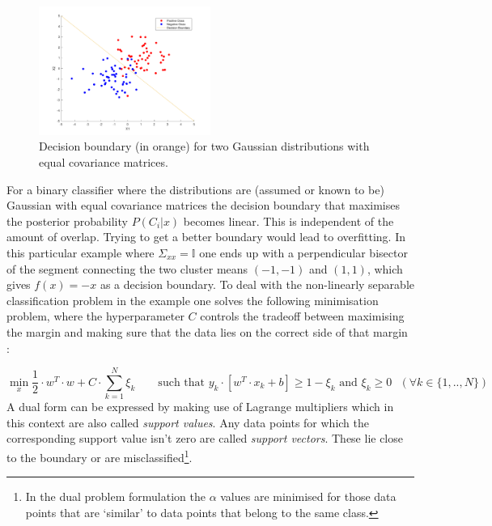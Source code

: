 
\begingroup
\setlength{\columnsep}{0.5cm}
\setlength{\intextsep}{0.5cm}
\begin{figure}
\includegraphics[width=0.5\textwidth]{../src/figures/twogaussians.pdf}
\caption{Decision boundary (in orange) for two Gaussian distributions with equal covariance matrices.}
\label{twogaussians}
\end{figure}
For a binary classifier where the distributions are (assumed or known to be) Gaussian with equal covariance matrices the decision boundary that maximises the posterior probability $P(C_i|x)$ becomes linear. This is independent of the amount of overlap. Trying to get a better boundary would lead to overfitting. In this particular example where $\Sigma_{xx}=\mathbb{I}$ one ends up with a perpendicular bisector of the segment connecting the two cluster means 
$(-1,-1)$ and $(1,1)$, which gives $f(x)=-x$ as a decision boundary.
To deal with the non-linearly separable classification problem in the example one solves the following minimisation problem, where the hyperparameter $C$ controls the tradeoff between maximising the margin and making sure that the data lies on the correct side of that margin :

\endgroup
\vspace{-0.5cm}
$$\min_x\frac{1}{2}\cdot w^T\cdot w+C\cdot \sum_{k=1}^N\xi_k\qquad\text{such that $y_k\cdot[w^T\cdot x_k+b]\geq 1-\xi_k$ and $\xi_k\geq 0$ $(\forall k\in\{1,..,N\})$}$$
A dual form can be expressed by making use of Lagrange multipliers which in this context are also called \textit{support values}. Any data points for which the corresponding support value isn't zero are called \textit{support vectors}. These lie close to the boundary or are misclassified\footnote{In the dual problem formulation the $\alpha$ values are minimised for those data points that are `similar' to data points that belong to the same class.}.

